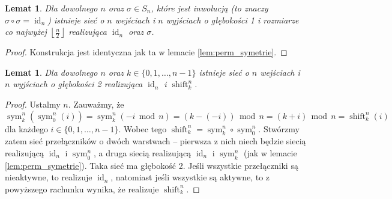 \documentclass[a4paper]{article}
\renewcommand{\mod}{\, \operatorname{mod} \,}
\newcommand{\shift}[2]{\operatorname{shift}_{#2}^{#1}}
\newcommand{\sym}[2]{\operatorname{sym}_{#2}^{#1}}
\newcommand{\id}[1]{\operatorname{id}_{#1}}
\newcommand{\floor}[1]{\left\lfloor #1 \right\rfloor}
\newtheorem{lem}[tw]{Lemat}
\theoremstyle{definition}
\begin{document}
\begin{lem}\label{lem:perm_inwolucje}
    Dla dowolnego \(n\) oraz \(\sigma \in S_n\), które jest inwolucją (to znaczy \(\sigma \circ \sigma = \id n\)) istnieje sieć o \(n\) wejściach i \(n\) wyjściach o głębokości 1 i rozmiarze co najwyżej \(\floor{\frac{n}{2}}\) realizująca \(\id n\) oraz \(\sigma\).
\end{lem}

\begin{proof}
    Konstrukcja jest identyczna jak ta w lemacie \ref{lem:perm_symetrie}.
\end{proof}

\begin{lem}\label{lem:perm_shifty}
     Dla dowolnego \(n\) oraz \(k \in \{0, 1, \ldots, n-1\}\) istnieje sieć o \(n\) wejściach i \(n\) wyjściach o głębokości 2 realizująca \(\id n\) i \(\shift{n}{k}\).
\end{lem}

\begin{proof}
    Ustalmy \(n\). Zauważmy, że
    \[
    \sym n k (\sym n 0 (i)) = \sym n k (-i \mod n) = (k - (-i)) \mod n = (k + i) \mod n  = \shift n k (i)
    \]
    dla każdego \(i \in \{0, 1, \ldots, n-1\}\). Wobec tego \(\shift n k = \sym n k \circ \sym n 0\). Stwórzmy zatem sieć przełączników o dwóch warstwach -- pierwsza z nich niech będzie siecią realizującą \(\id n\) i \(\sym n 0\), a druga siecią realizującą \(\id n\) i  \(\sym n k\) (jak w lemacie \ref{lem:perm_symetrie}). Taka sieć ma głębokość 2. Jeśli wszystkie przełączniki są nieaktywne, to realizuje \(\id n\), natomiast jeśli wszystkie są aktywne, to z powyższego rachunku wynika, że realizuje \(\shift n k\).
\end{proof}
\end{document}
